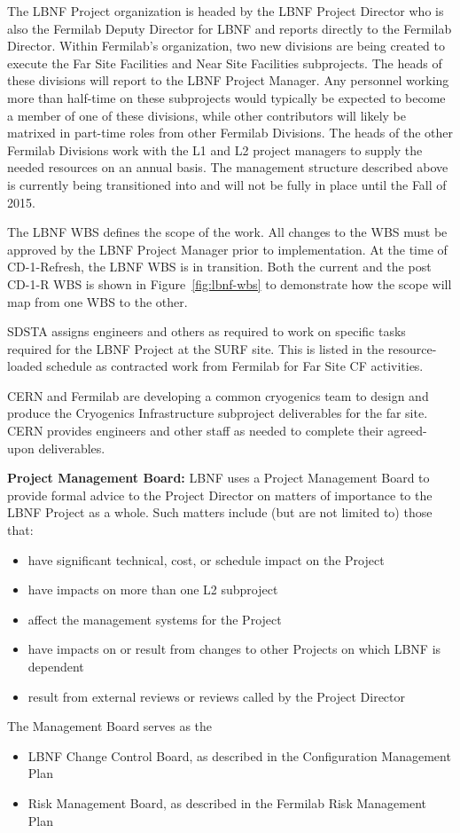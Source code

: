 The LBNF Project organization is headed by the LBNF Project Director who is also the Fermilab Deputy Director for LBNF and reports directly to the Fermilab Director. 
Within Fermilab’s organization, two new divisions are being created to execute the Far Site Facilities and Near Site Facilities subprojects. The heads of these divisions will report to the LBNF Project Manager. 
Any personnel working more than half-time on these subprojects would typically be expected to become a member of one of these divisions, while other contributors will likely be matrixed in part-time roles from other Fermilab Divisions.  The heads of the other Fermilab Divisions work with the L1 and L2 project managers to supply the needed resources on an annual basis.  The management structure described above is currently being transitioned into and will not be fully in place until the Fall of 2015.  

The LBNF WBS defines the scope of the work. All changes to the WBS must be approved by the LBNF Project Manager prior to implementation. At the time of CD-1-Refresh, the LBNF WBS is in transition. Both the current and the post CD-1-R WBS is shown in Figure~\ref{fig:lbnf-wbs} to demonstrate how the scope will map from one WBS to the other. 

SDSTA assigns engineers and others as required to work on specific tasks required for the LBNF Project at the SURF site. This is listed in the resource-loaded schedule as contracted work from Fermilab for Far Site CF activities. 

CERN and Fermilab are developing a common cryogenics team to design and produce the Cryogenics Infrastructure subproject deliverables for the far site. CERN provides engineers and other staff as needed to complete their agreed-upon deliverables.  


\textbf{Project Management Board:} LBNF uses a Project Management Board to provide formal advice to the Project Director on matters of importance to the LBNF Project as a whole. Such matters include (but are not limited to) those that:
\begin{itemize}
\item have significant technical, cost, or schedule impact on the Project
\item have impacts on more than one L2 subproject
\item affect the management systems for the Project
\item have impacts on or result from changes to other Projects on which LBNF is dependent
\item result from external reviews or reviews called by the Project Director
\end{itemize}
The Management Board serves as the
\begin{itemize}
\item LBNF Change Control Board, as described in the Configuration Management Plan \fixme{[ref]}
\item Risk Management Board, as described in the Fermilab Risk Management Plan  \fixme{[ref]}
\end{itemize}

